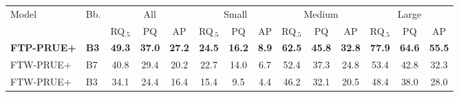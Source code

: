 \footnotesize
\setlength{\tabcolsep}{4pt}
\begin{tabular}{@{}llcccccccccccc@{}}
\toprule
Model & Bb. & \multicolumn{3}{c}{All} & \multicolumn{3}{c}{Small} & \multicolumn{3}{c}{Medium} & \multicolumn{3}{c}{Large} \\
\cmidrule(lr){3-5} \cmidrule(lr){6-8} \cmidrule(lr){9-11} \cmidrule(lr){12-14}
 & & RQ$_{.5}$ & PQ & AP & RQ$_{.5}$ & PQ & AP & RQ$_{.5}$ & PQ & AP & RQ$_{.5}$ & PQ & AP \\
\midrule
\textbf{FTP-PRUE+} & \textbf{B3} & \textbf{49.3} & \textbf{37.0} & \textbf{27.2} & \textbf{24.5} & \textbf{16.2} & \textbf{8.9} & \textbf{62.5} & \textbf{45.8} & \textbf{32.8} & \textbf{77.9} & \textbf{64.6} & \textbf{55.5} \\
FTW-PRUE+ & B7 & 40.8 & 29.4 & 20.2 & 22.7 & 14.0 & 6.7 & 52.4 & 37.3 & 24.8 & 53.4 & 42.8 & 32.3 \\
FTW-PRUE+ & B3 & 34.1 & 24.4 & 16.4 & 15.4 & 9.5 & 4.4 & 46.2 & 32.1 & 20.5 & 48.4 & 38.0 & 28.0 \\
\bottomrule
\end{tabular}
